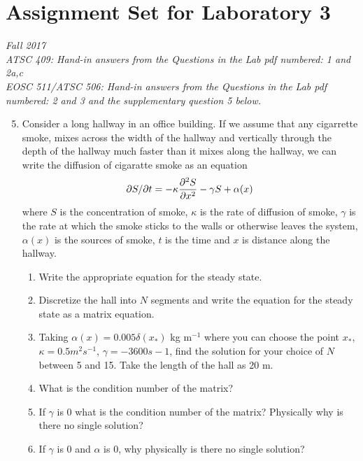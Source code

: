 \documentclass[12pt]{article}
\begin{document}
\section*{Assignment Set for Laboratory 3}
{\it Fall 2017\\
ATSC 409: Hand-in answers from the Questions in the Lab pdf numbered: 1 and 2a,c\\
EOSC 511/ATSC 506: Hand-in answers from the Questions in the Lab pdf numbered: 2 and 3 and the supplementary question 5 below.}


\begin{enumerate}
\setcounter{enumi}{4}
\item Consider a long hallway in an office building.  If we assume that any cigarrette smoke, mixes across the width of the hallway and vertically through the depth of the hallway much faster than it mixes along the hallway, we can write the diffusion of cigaratte smoke as an equation
\[
\partial S/\partial t = - \kappa \frac {\partial^2 S}{\partial x^2} - \gamma S + \alpha(x)
\]
where $S$ is the concentration of smoke, $\kappa$ is the rate of diffusion of smoke, $\gamma$ is the rate at which the smoke sticks to the walls or otherwise leaves the system, $\alpha(x)$ is the sources of smoke, $t$ is the time and $x$ is distance along the hallway.
\begin{enumerate}
\item Write the appropriate equation for the steady state.
\item Discretize the hall into $N$ segments and write the equation for the steady state as a matrix equation.
\item Taking $\alpha(x) = 0.005 \delta(x_*)$ kg m$^{-1}$ where you can choose the point $x_*$, $\kappa = 0.5 m^2 s^{-1}$, $\gamma = -3600 s-1$, find the solution for your choice of $N$ between 5 and 15.  Take the length of the hall as 20 m.
\item What is the condition number of the matrix?
\item If $\gamma$ is 0 what is the condition number of the matrix?  Physically why is there no single solution?
\item If $\gamma$ is 0 and $\alpha$ is 0, why physically is there no single solution?
\end{enumerate}
\end{enumerate}
\end{document}
